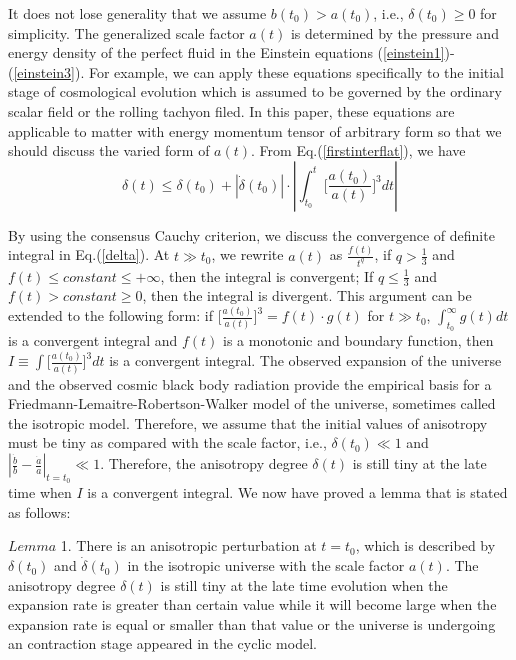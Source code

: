 \documentclass[a4paper,preprint]{revtex4}
\begin{document}
It does not lose generality that we assume $b(t_0)>a(t_0)$, i.e.,
$\delta(t_0)\geq 0$ for simplicity. The generalized scale factor
$a(t)$ is determined by the pressure and energy density of the
perfect fluid in the Einstein equations
(\ref{einstein1})-(\ref{einstein3}). For example, we can apply
these equations specifically to the initial stage of cosmological
evolution which  is assumed to be governed by the ordinary scalar
field or the rolling tachyon filed. In this paper, these equations
are applicable to matter with energy momentum tensor of arbitrary
form so that we should discuss the varied form of $a(t)$. From
Eq.(\ref{firstinterflat}), we have
\begin{equation}\label{delta}
 \delta(t)\leq\delta(t_0)+|\dot{\delta}(t_0)|\cdot |\int_{t_0}^{t}\Big[\frac{a(t_0)}
 {a(t)}\Big]^3dt|
\end{equation}

\noindent By using the consensus Cauchy criterion, we discuss the
convergence of definite integral in Eq.(\ref{delta}). At $t\gg
t_0$, we rewrite $a(t)$ as $\frac{f(t)}{t^q}$, if $q>\frac{1}{3}$
and $f(t)\leq constant \leq +\infty$, then the integral is
convergent; If $q\leq\frac{1}{3}$ and $f(t)>constant\geq 0$, then
the integral is divergent. This argument can be extended to the
following form: if $\bigg[\frac{a(t_0)}{a(t)}\bigg]^3=f(t)\cdot
g(t)$ for $t\gg t_0$, $\int_{t_0}^{\infty}g(t)dt$ is a convergent
integral and $f(t)$ is a monotonic and boundary function, then
$I\equiv \int\bigg[\frac{a(t_0)}{a(t)}\bigg]^3dt$ is a convergent
integral. The observed expansion of the universe and the observed
cosmic black body radiation provide the empirical basis for a
Friedmann-Lemaitre-Robertson-Walker model of the universe,
sometimes called the isotropic model. Therefore, we assume that
the initial values of anisotropy must be tiny as compared with the
scale factor, i.e., $\delta(t_0)\ll 1$ and
$|\frac{\dot{b}}{b}-\frac{\dot{a}}{a}|_{t=t_0}\ll 1$. Therefore,
the anisotropy degree $\delta(t)$ is still tiny at the late time
when $I$ is a convergent integral. We now have proved a lemma that
is stated as follows:

$Lemma$ 1. There is an anisotropic perturbation at $t=t_0$, which
is described by $\delta(t_0)$ and $\dot{\delta}(t_0)$ in the
isotropic universe with the scale factor $a(t)$. The anisotropy
degree $\delta(t)$ is still tiny at the late time evolution when
the expansion rate is greater than certain value while it will
become large when the expansion rate is equal or smaller than that
value or the universe is undergoing an contraction stage appeared
in the cyclic model.
\end{document}
